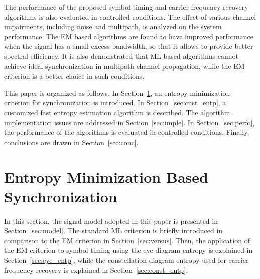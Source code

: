 \documentclass[12pt, draftclsnofoot, onecolumn]{IEEEtran}
\begin{document}
The performance of the proposed symbol timing and carrier frequency recovery algorithms is also evaluated in controlled conditions. 
The effect of various channel impairments, including noise and multipath, is analyzed on the system performance.  
The EM based algorithms are found to have improved performance when the signal has a small excess bandwidth, so that it allows to provide better spectral efficiency.
It is also demonstrated that ML based algorithms cannot achieve ideal synchronization in multipath channel propagation, while the EM criterion is a better choice in such conditions. 



This paper is organized as follows.
In Section~\ref{sec:entropy},
an entropy minimization criterion for synchronization is introduced. 
In Section~\ref{sec:cust_entp}, a customized fast entropy estimation algorithm is described. 
The algorithm implementation issues are addressed in Section~\ref{sec:imple}.
In Section~\ref{sec:perfo}, the performance of the algorithms is evaluated in controlled conditions.
Finally, conclusions are drawn in Section~\ref{sec:conc}.

\section{Entropy Minimization Based Synchronization}
\label{sec:entropy}
In this section, the signal model adopted in this paper is presented in Section~\ref{sec:model}.
The standard ML criterion is briefly introduced in comparison to the EM criterion in Section~\ref{sec:versus}.
Then, the application of the EM criterion to symbol timing using the eye diagram entropy is explained in Section~\ref{sec:eye_entp},
while the constellation diagram entropy used for carrier frequency recovery is explained in Section~\ref{sec:const_entp}.
\end{document}
